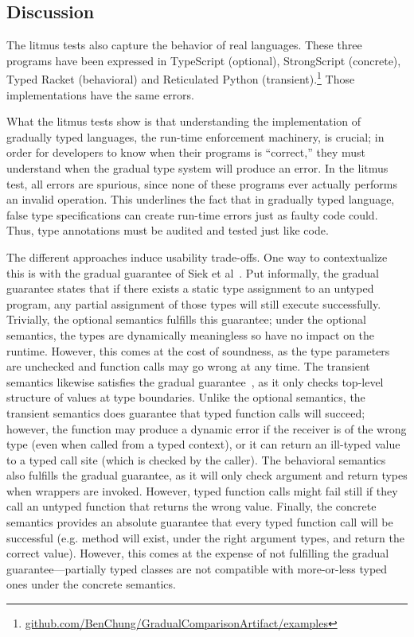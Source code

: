 \documentclass[USenglish]{tex/lipics-v2016}
\begin{document}
\subsection{Discussion}

The litmus tests also capture the behavior of real languages. These three
programs have been expressed in TypeScript (optional), StrongScript
(concrete), Typed Racket (behavioral) and Reticulated Python
(transient).\footnote{\small
  \url{github.com/BenChung/GradualComparisonArtifact/examples}} Those
implementations have the same errors.

What the litmus tests show is that understanding the implementation of
gradually typed languages, the run-time enforcement machinery, is crucial;
in order for developers to know when their programs is ``correct,'' they must
understand when the gradual type system will produce an error. In
the litmus test, all errors are spurious, since none of these programs ever
actually performs an invalid operation. This underlines the fact that in 
gradually typed language, false type specifications can create run-time
errors just as faulty code could. Thus, type annotations must be audited 
and tested just like code.

The different approaches induce usability trade-offs. One way to contextualize
this is with the gradual guarantee of Siek et al~\cite{GradualGuarantee}. Put
informally, the gradual guarantee states that if there exists a static type
assignment to an untyped program, any partial assignment of those types will
still execute successfully. Trivially, the optional semantics fulfills this
guarantee; under the optional semantics, the types are dynamically meaningless
so have no impact on the runtime. However, this comes at the cost of
soundness, as the type parameters are unchecked and function calls may go
wrong at any time.  The transient semantics likewise satisfies the gradual
guarantee~\cite{Vitousek2017},  as it only checks top-level structure of
values at type boundaries. Unlike the  optional semantics, the transient
semantics does guarantee that typed function calls will succeed; however, the
function may produce a dynamic error if the receiver is of the wrong type
(even when called from a typed context), or it can return an  ill-typed value
to a typed call site (which is checked by the caller). The behavioral
semantics also fulfills the gradual guarantee, as it will only check argument
and return types when wrappers are invoked. However, typed function calls
might fail still if they call an untyped function that returns the wrong
value. Finally, the concrete semantics provides an absolute guarantee that
every typed function call will be successful (e.g. method will exist, under
the right argument types, and return the correct value). However, this comes
at the expense of not fulfilling the gradual guarantee---partially typed
classes are not compatible with more-or-less typed ones under the concrete
semantics.
\end{document}
